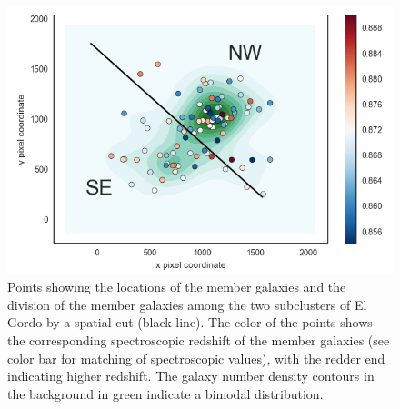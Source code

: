 \documentclass[letterpaper,useAMS,usenatbib]{mn2e}
\begin{document}
\begin{figure}
	\includegraphics[width = \linewidth]{confirmed_member_divide.png}
	\caption{\label{fig:membership} Points showing the locations of the
	member galaxies and the division of the member galaxies among the two subclusters of El Gordo by a spatial cut
(black line). The color of the points shows the corresponding spectroscopic
redshift of the member galaxies (see color bar for matching of
spectroscopic values), with the redder end indicating higher
redshift. The galaxy number density contours in the background in green indicate a bimodal
distribution.} 
\end{figure}
\end{document}

